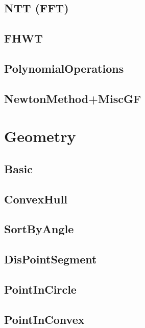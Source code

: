 	\subsection{NTT (FFT)}
	
	\subsection{FHWT}
	
	\subsection{PolynomialOperations}
	
	\subsection{NewtonMethod+MiscGF}
	
\section{Geometry}
	\subsection{Basic}
	
	\subsection{ConvexHull}
	
	\subsection{SortByAngle}
	
	\subsection{DisPointSegment}
	
	\subsection{PointInCircle}
	
	\subsection{PointInConvex}
	
